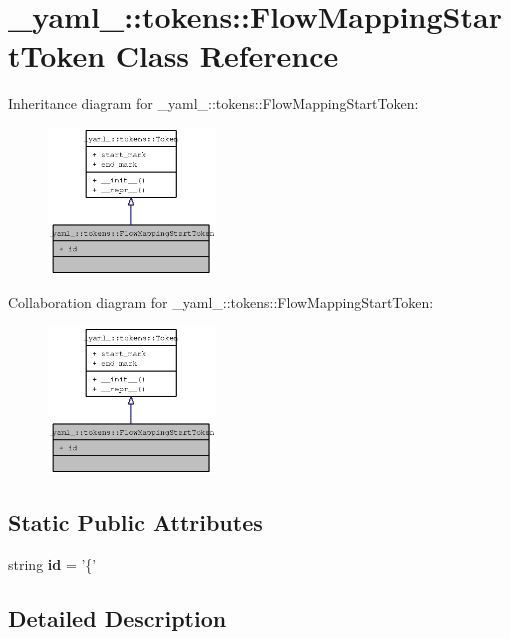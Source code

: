 \section{\_\-yaml\_\-::tokens::FlowMappingStartToken Class Reference}
\label{class__yaml___1_1tokens_1_1FlowMappingStartToken}
Inheritance diagram for \_\-yaml\_\-::tokens::FlowMappingStartToken:\nopagebreak
\begin{figure}[H]
\begin{center}
\leavevmode
\includegraphics[width=126pt]{class__yaml___1_1tokens_1_1FlowMappingStartToken__inherit__graph}
\end{center}
\end{figure}
Collaboration diagram for \_\-yaml\_\-::tokens::FlowMappingStartToken:\nopagebreak
\begin{figure}[H]
\begin{center}
\leavevmode
\includegraphics[width=126pt]{class__yaml___1_1tokens_1_1FlowMappingStartToken__coll__graph}
\end{center}
\end{figure}
\subsection*{Static Public Attributes}
\begin{CompactItemize}
\item 
string {\bf id} = '\{'
\end{CompactItemize}


\subsection{Detailed Description}


